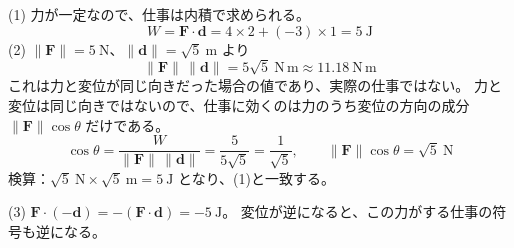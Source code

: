 \documentclass[11pt]{article}
\begin{document}
\problem
\begin{ans}
(1) 力が一定なので、仕事は内積で求められる。
\[ W=\boldsymbol F\cdot\boldsymbol d=4\times2+(-3)\times1=5\ \mathrm J \]
(2) $\|\boldsymbol F\|=5\ \mathrm N$、$\|\boldsymbol d\|=\sqrt5\ \mathrm m$ より
\[ \|\boldsymbol F\|\,\|\boldsymbol d\|=5\sqrt5\ \mathrm{N\,m}\approx11.18\ \mathrm{N\,m} \]
これは力と変位が同じ向きだった場合の値であり、実際の仕事ではない。
力と変位は同じ向きではないので、仕事に効くのは力のうち変位の方向の成分 $\|\boldsymbol F\|\cos\theta$ だけである。
\[ \cos\theta=\frac{W}{\|\boldsymbol F\|\,\|\boldsymbol d\|}=\frac{5}{5\sqrt5}=\frac1{\sqrt5},\qquad
\|\boldsymbol F\|\cos\theta=\sqrt5\ \mathrm N \]
検算：$\sqrt5\ \mathrm N\times\sqrt5\ \mathrm m=5\ \mathrm J$ となり、(1)と一致する。


(3) $\boldsymbol F\cdot(-\boldsymbol d)=-(\boldsymbol F\cdot\boldsymbol d)=-5\ \mathrm J$。
変位が逆になると、この力がする仕事の符号も逆になる。
\end{ans}
\end{document}
